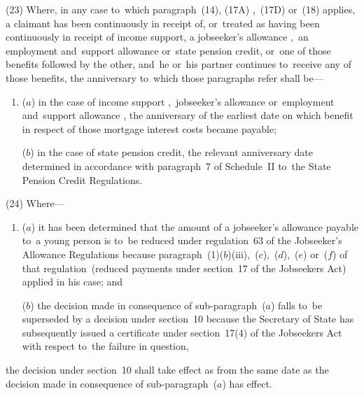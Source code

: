 \documentclass[12pt,a4paper]{article}
\begin{document}
(23) Where, in any case to~which paragraph~(14), (17A)%
,~(17D)  %
or~(18) applies, a claimant has been continuously in receipt of, or~treated as having been continuously in receipt of income support, a jobseeker’s allowance%
,~an employment and~support allowance  %
or~state pension credit, or~one of those benefits followed by the other, and~he or~his partner continues to~receive any of those benefits, the anniversary to~which those paragraphs refer shall be—
\begin{enumerate}\item[]
($a$) in the case of income support%
,~jobseeker’s allowance or~employment and~support allowance%
, the anniversary of the earliest date on which benefit in respect of those mortgage interest costs became payable;

($b$) in the case of state pension credit, the relevant anniversary date determined in accordance with paragraph~7 of Schedule~II to~the State Pension Credit Regulations.
\end{enumerate}

(24) Where—
\begin{enumerate}\item[]
($a$) it has been determined that the amount of a jobseeker’s allowance payable to~a young person is to~be reduced under regulation~63 of the Jobseeker’s Allowance Regulations because paragraph~(1)($b$)(iii),~($c$),~($d$),~($e$) or~($f$) of that regulation~(reduced payments under section~17 of the Jobseekers Act) applied in his case; and

($b$) the decision made in consequence of sub-paragraph~($a$) falls to~be superseded by a decision under section~10 because the Secretary of State has subsequently issued a certificate under section~17(4) of the Jobseekers Act with respect to~the failure in question,
\end{enumerate}
the decision under section~10 shall take effect as from the same date as the decision made in consequence of sub-paragraph~($a$) has effect.

\end{document}
